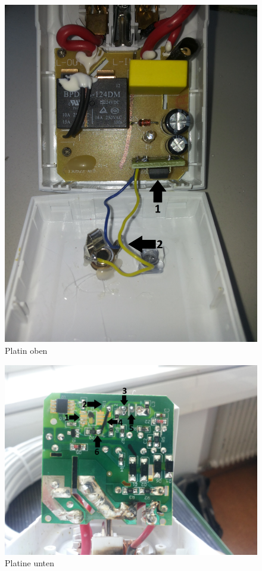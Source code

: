 \begin{figure}[H]
\centering
\includegraphics[keepaspectratio=true, width=13cm]{images/rpi/rpi_platine_top.jpg}
\caption{Platin oben}
\label{fig:report_hardware_plTo}
\end{figure}
\begin{figure}[H]
\centering
\includegraphics[keepaspectratio=true, width=17cm]{images/rpi/rpi_platine_bottom.jpg}
\caption{Platine unten}
\label{fig:report_hardware_plBo}
\end{figure}
